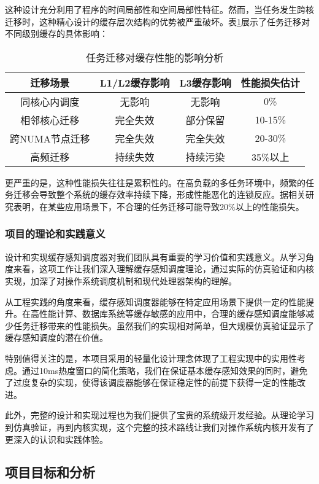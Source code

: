 这种设计充分利用了程序的时间局部性和空间局部性特征。然而，当任务发生跨核迁移时，这种精心设计的缓存层次结构的优势被严重破坏。表\ref{tab:migration-impact}展示了任务迁移对不同级别缓存的具体影响：

\begin{table}[h]
\centering
\begin{tabular}{|c|c|c|c|}
\hline
迁移场景 & L1/L2缓存影响 & L3缓存影响 & 性能损失估计 \\
\hline
同核心内调度 & 无影响 & 无影响 & 0\% \\
相邻核心迁移 & 完全失效 & 部分保留 & 10-15\% \\
跨NUMA节点迁移 & 完全失效 & 完全失效 & 20-30\% \\
高频迁移 & 持续失效 & 持续污染 & 35\%以上 \\
\hline
\end{tabular}
\caption{任务迁移对缓存性能的影响分析}
\label{tab:migration-impact}
\end{table}

更严重的是，这种性能损失往往是累积性的。在高负载的多任务环境中，频繁的任务迁移会导致整个系统的缓存效率持续下降，形成性能恶化的连锁反应。据相关研究表明，在某些应用场景下，不合理的任务迁移可能导致20\%以上的性能损失。

\subsubsection{项目的理论和实践意义}

设计和实现缓存感知调度器对我们团队具有重要的学习价值和实践意义。从学习角度来看，这项工作让我们深入理解缓存感知调度理论，通过实际的仿真验证和内核实现，加深了对操作系统调度机制和现代处理器架构的理解。

从工程实践的角度来看，缓存感知调度器能够在特定应用场景下提供一定的性能提升。在高性能计算、数据库系统等缓存敏感的应用中，合理的缓存感知调度能够减少任务迁移带来的性能损失。虽然我们的实现相对简单，但大规模仿真验证显示了缓存感知调度的潜在价值。

特别值得关注的是，本项目采用的轻量化设计理念体现了工程实现中的实用性考虑。通过10ms热度窗口的简化策略，我们在保证基本缓存感知效果的同时，避免了过度复杂的实现，使得该调度器能够在保证稳定性的前提下获得一定的性能改进。

此外，完整的设计和实现过程也为我们提供了宝贵的系统级开发经验。从理论学习到仿真验证，再到内核实现，这个完整的技术路线让我们对操作系统内核开发有了更深入的认识和实践体验。

\subsection{项目目标和分析}



